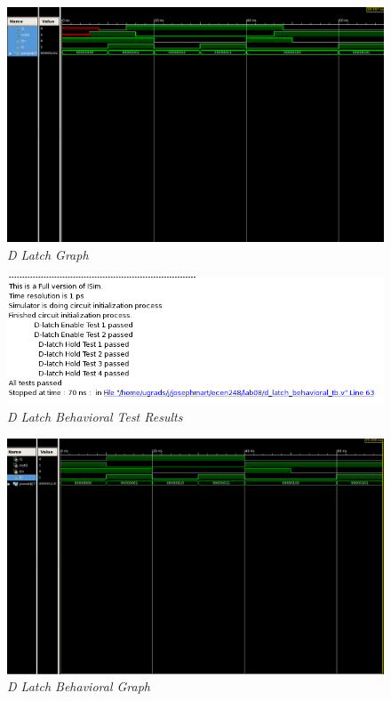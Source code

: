 \documentclass[a4paper,12pt]{article}
\begin{document}
  \newpage
  
  \begin{figure}[h]
    \begin{center}
      \includegraphics[scale=0.2]{D_latch_graph.png}
      \caption{\textit{D Latch Graph}}
    \end{center}
  \end{figure}

  \begin{figure}[h]
    \begin{center}
      \includegraphics[scale=0.2]{d_latch_Behavioral_tests.png}
      \caption{\textit{D Latch Behavioral Test Results}}
    \end{center}
  \end{figure}
  
  \newpage
  
  \begin{figure}[h]
    \begin{center}
      \includegraphics[scale=0.2]{d_latch_Behavioral_graph.png}
      \caption{\textit{D Latch Behavioral Graph}}
    \end{center}
  \end{figure}
\end{document}
